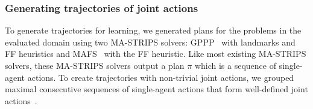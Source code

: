 \documentclass[letterpaper]{article} %
\theoremstyle{definition}
\theoremstyle{remark}
\begin{document}
\subsubsection{Generating trajectories of joint actions}
To generate trajectories for learning, we generated plans for the problems in the evaluated domain using two MA-STRIPS solvers: GPPP~ with landmarks and FF heuristics and MAFS~ with the FF heuristic.
Like most existing MA-STRIPS solvers,
these MA-STRIPS solvers output a plan $\pi$ which is a sequence of single-agent actions.
To create trajectories with non-trivial joint actions, we grouped maximal consecutive sequences of single-agent actions that form well-defined joint actions~\cite{crosby2014single}.
\end{document}
